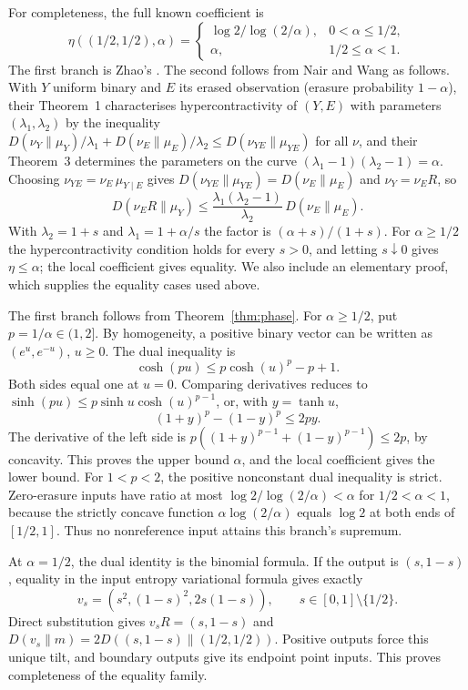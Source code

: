 \documentclass[11pt,a4paper]{article}
\numberwithin{equation}{section}
\theoremstyle{definition}
\theoremstyle{remark}
\newcommand{\KL}{D}
\begin{document}
For completeness, the full known coefficient is
\begin{equation}\label{eq:binary}
\eta((1/2,1/2),\alpha)=
\begin{cases}
\log2/\log(2/\alpha),&0<\alpha\le1/2,\\
\alpha,&1/2\le\alpha<1.
\end{cases}
\end{equation}
The first branch is Zhao's \cite[Theorem~3.5.4]{zhao}. The second follows
from Nair and Wang \cite{nair} as follows. With \(Y\) uniform binary and
\(E\) its erased observation (erasure probability \(1-\alpha\)), their
Theorem~1 characterises hypercontractivity of \((Y,E)\) with parameters
\((\lambda_1,\lambda_2)\) by the inequality
\(\KL(\nu_Y\|\mu_Y)/\lambda_1+\KL(\nu_E\|\mu_E)/\lambda_2
\le\KL(\nu_{YE}\|\mu_{YE})\) for all \(\nu\), and their Theorem~3
determines the parameters on the curve
\((\lambda_1-1)(\lambda_2-1)=\alpha\). Choosing
\(\nu_{YE}=\nu_E\,\mu_{Y\mid E}\) gives
\(\KL(\nu_{YE}\|\mu_{YE})=\KL(\nu_E\|\mu_E)\) and \(\nu_Y=\nu_ER\), so
\[
\KL(\nu_ER\|\mu_Y)\le\frac{\lambda_1(\lambda_2-1)}{\lambda_2}\,\KL(\nu_E\|\mu_E).
\]
With \(\lambda_2=1+s\) and \(\lambda_1=1+\alpha/s\) the factor is
\((\alpha+s)/(1+s)\). For \(\alpha\ge1/2\) the hypercontractivity
condition holds for every \(s>0\), and letting \(s\downarrow0\) gives
\(\eta\le\alpha\); the local coefficient gives equality. We also include an
elementary proof, which supplies the equality cases used above.

The first branch follows from Theorem~\ref{thm:phase}. For
\(\alpha\ge1/2\), put \(p=1/\alpha\in(1,2]\). By homogeneity, a positive
binary vector can be written as \((e^u,e^{-u})\), \(u\ge0\). The dual
inequality is
\[
\cosh(pu)\le p\cosh(u)^p-p+1 .
\]
Both sides equal one at \(u=0\). Comparing derivatives reduces to
\(\sinh(pu)\le p\sinh u\cosh(u)^{p-1}\), or, with \(y=\tanh u\),
\[
(1+y)^p-(1-y)^p\le2py .
\]
The derivative of the left side is
\(p((1+y)^{p-1}+(1-y)^{p-1})\le2p\), by concavity. This proves the upper
bound \(\alpha\), and the local coefficient gives the lower bound. For
\(1<p<2\), the positive nonconstant dual inequality is strict.
Zero-erasure inputs have ratio at most \(\log2/\log(2/\alpha)<\alpha\) for
\(1/2<\alpha<1\), because the strictly concave function
\(\alpha\log(2/\alpha)\) equals \(\log2\) at both ends of \([1/2,1]\). Thus
no nonreference input attains this branch's supremum.

At \(\alpha=1/2\), the dual identity is the binomial formula. If the output
is \((s,1-s)\), equality in the input entropy variational formula gives
exactly
\[
v_s=(s^2,(1-s)^2,2s(1-s)),\qquad s\in[0,1]\setminus\{1/2\}.
\]
Direct substitution gives \(v_sR=(s,1-s)\) and
\(\KL(v_s\|m)=2\KL((s,1-s)\|(1/2,1/2))\). Positive outputs force this
unique tilt, and boundary outputs give its endpoint point inputs. This
proves completeness of the equality family.
\end{document}
